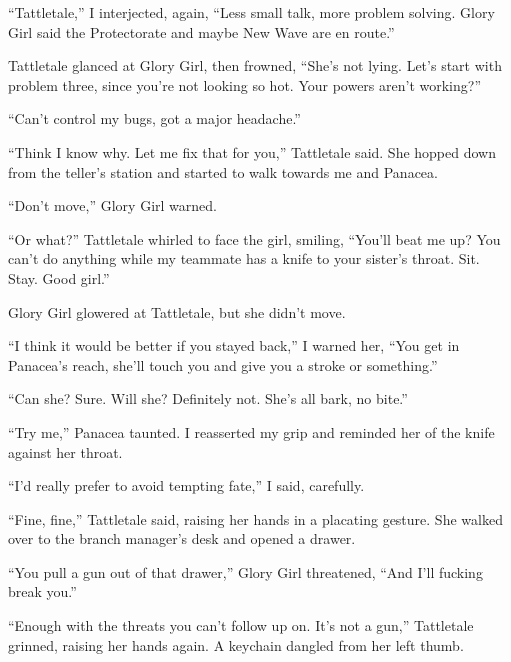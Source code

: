 ``Tattletale,'' I interjected, again, ``Less small talk, more problem solving.  Glory Girl said the Protectorate and maybe New Wave are en route.''



Tattletale glanced at Glory Girl, then frowned, ``She's not lying.  Let's start with problem three, since you're not looking so hot.  Your powers aren't working?''



``Can't control my bugs, got a major headache.''



``Think I know why.  Let me fix that for you,'' Tattletale said.  She hopped down from the teller's station and started to walk towards me and Panacea.



``Don't move,'' Glory Girl warned.



``Or what?'' Tattletale whirled to face the girl, smiling, ``You'll beat me up?  You can't do anything while my teammate has a knife to your sister's throat.  Sit.  Stay.  Good girl.''



Glory Girl glowered at Tattletale, but she didn't move.



``I think it would be better if you stayed back,'' I warned her, ``You get in Panacea's reach, she'll touch you and give you a stroke or something.''



``Can she?  Sure.  Will she?  Definitely not.  She's all bark, no bite.''



``Try me,'' Panacea taunted.  I reasserted my grip and reminded her of the knife against her throat.



``I'd really prefer to avoid tempting fate,'' I said, carefully.



``Fine, fine,'' Tattletale said, raising her hands in a placating gesture.  She walked over to the branch manager's desk and opened a drawer.



``You pull a gun out of that drawer,'' Glory Girl threatened, ``And I'll fucking break you.''



``Enough with the threats you can't follow up on.  It's not a gun,'' Tattletale grinned, raising her hands again.  A keychain dangled from her left thumb.



